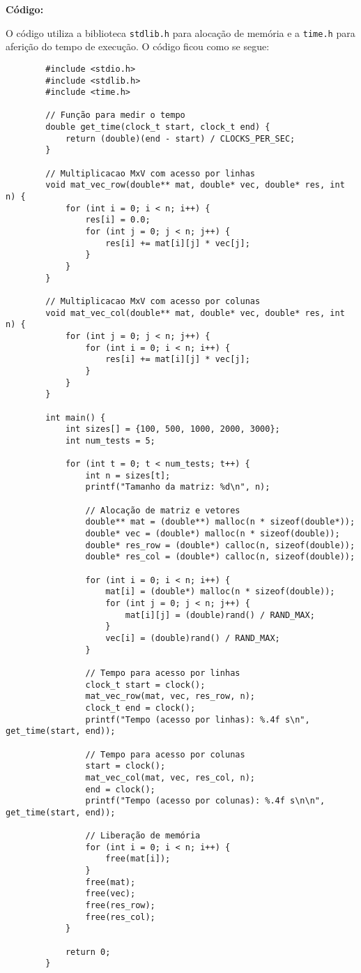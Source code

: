 \documentclass[a4paper, 12pt]{article}
\begin{document}
	\vspace{0,5cm}
	
	\textbf{Código:}
	
	O código utiliza a biblioteca \texttt{stdlib.h} para alocação de memória e a \texttt{time.h} para aferição do tempo de execução. O código ficou como se segue:
	
	
	\begin{verbatim}
		#include <stdio.h>
		#include <stdlib.h>
		#include <time.h>
		
		// Função para medir o tempo
		double get_time(clock_t start, clock_t end) {
			return (double)(end - start) / CLOCKS_PER_SEC;
		}
		
		// Multiplicacao MxV com acesso por linhas
		void mat_vec_row(double** mat, double* vec, double* res, int n) {
			for (int i = 0; i < n; i++) {
				res[i] = 0.0;
				for (int j = 0; j < n; j++) {
					res[i] += mat[i][j] * vec[j];
				}
			}
		}
		
		// Multiplicacao MxV com acesso por colunas
		void mat_vec_col(double** mat, double* vec, double* res, int n) {
			for (int j = 0; j < n; j++) {
				for (int i = 0; i < n; i++) {
					res[i] += mat[i][j] * vec[j];
				}
			}
		}
		
		int main() {
			int sizes[] = {100, 500, 1000, 2000, 3000};
			int num_tests = 5;
			
			for (int t = 0; t < num_tests; t++) {
				int n = sizes[t];
				printf("Tamanho da matriz: %d\n", n);
				
				// Alocação de matriz e vetores
				double** mat = (double**) malloc(n * sizeof(double*));
				double* vec = (double*) malloc(n * sizeof(double));
				double* res_row = (double*) calloc(n, sizeof(double));
				double* res_col = (double*) calloc(n, sizeof(double));
				
				for (int i = 0; i < n; i++) {
					mat[i] = (double*) malloc(n * sizeof(double));
					for (int j = 0; j < n; j++) {
						mat[i][j] = (double)rand() / RAND_MAX;
					}
					vec[i] = (double)rand() / RAND_MAX;
				}
				
				// Tempo para acesso por linhas
				clock_t start = clock();
				mat_vec_row(mat, vec, res_row, n);
				clock_t end = clock();
				printf("Tempo (acesso por linhas): %.4f s\n", get_time(start, end));
				
				// Tempo para acesso por colunas
				start = clock();
				mat_vec_col(mat, vec, res_col, n);
				end = clock();
				printf("Tempo (acesso por colunas): %.4f s\n\n", get_time(start, end));
				
				// Liberação de memória
				for (int i = 0; i < n; i++) {
					free(mat[i]);
				}
				free(mat);
				free(vec);
				free(res_row);
				free(res_col);
			}
			
			return 0;
		}
		
	\end{verbatim}
	
\end{document}
